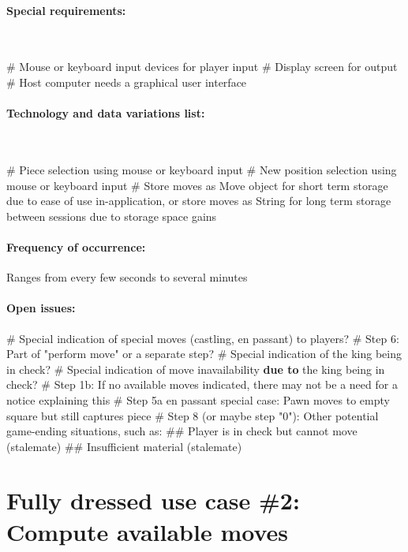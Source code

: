 \documentclass{article}
\begin{document}
\paragraph{Special requirements:}\mbox{}\\
\begin{easylist}[itemize]
# Mouse or keyboard input devices for player input
# Display screen for output
# Host computer needs a graphical user interface
\end{easylist}

\paragraph{Technology and data variations list:}\mbox{}\\
\begin{easylist}[itemize]
# Piece selection using mouse or keyboard input
# New position selection using mouse or keyboard input
# Store moves as Move object for short term storage due to ease of use in-application, or store moves as String for long term storage between sessions due to storage space gains
\end{easylist}

\paragraph{Frequency of occurrence:} Ranges from every few seconds to several minutes

\paragraph{Open issues:}\mbox{}
\begin{easylist}[itemize]
# Special indication of special moves (castling, en passant) to players?
# Step 6: Part of "perform move" or a separate step?
# Special indication of the king being in check?
# Special indication of move inavailability \textbf{due to} the king being in check?
# Step 1b: If no available moves indicated, there may not be a need for a notice explaining this
# Step 5a en passant special case: Pawn moves to empty square but still captures piece
# Step 8 (or maybe step "0"): Other potential game-ending situations, such as:
## Player is in check but cannot move (stalemate)
## Insufficient material (stalemate)
\end{easylist}

\section*{Fully dressed use case \#2: Compute available moves}
\end{document}
